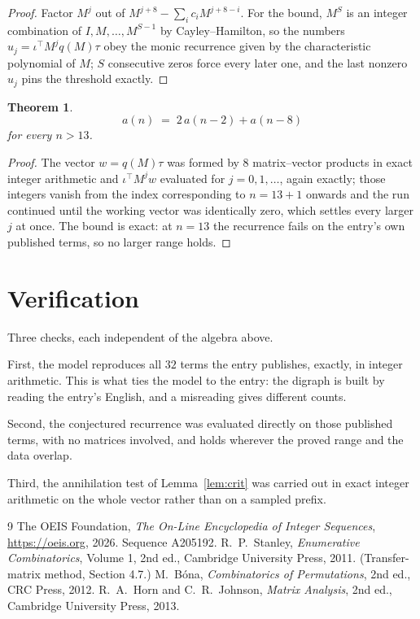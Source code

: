 \documentclass[11pt,a4paper]{article}
\theoremstyle{plain}
\newtheorem{theorem}{Theorem}
\theoremstyle{definition}
\begin{document}
\begin{proof}
Factor $M^{j}$ out of $M^{j+8}-\sum_ic_iM^{j+8-i}$. For the bound, $M^{S}$
is an integer combination of $I,M,\dots,M^{S-1}$ by Cayley--Hamilton, so the numbers
$u_j=\iota^{\!\top}M^{j}q(M)\tau$ obey the monic recurrence given by the characteristic
polynomial of $M$; $S$ consecutive zeros force every later one, and the last nonzero $u_j$
pins the threshold exactly.
\end{proof}

\begin{theorem}
\[
a(n)\;=\;2\,a(n-2) + a(n-8)
\]
for every $n>13$.
\end{theorem}

\begin{proof}
The vector $w=q(M)\tau$ was formed by $8$ matrix--vector products in exact integer
arithmetic and $\iota^{\!\top}M^{j}w$ evaluated for $j=0,1,\dots$, again exactly; those
integers vanish from the index corresponding to $n=13+1$ onwards and the run continued
until the working vector was identically zero, which settles every larger $j$ at once. The bound is exact: at $n=13$ the recurrence fails on the entry's own published terms, so no larger range holds.
\end{proof}

\section{Verification}

Three checks, each independent of the algebra above.

First, the model reproduces all $32$ terms the entry publishes, exactly, in integer
arithmetic. This is what ties the model to the entry: the digraph is built by reading the
entry's English, and a misreading gives different counts.

Second, the conjectured recurrence was evaluated directly on those published terms, with no
matrices involved, and holds wherever the proved range and the data overlap.

Third, the annihilation test of Lemma~\ref{lem:crit} was carried out in exact integer
arithmetic on the whole vector rather than on a sampled prefix.

\begin{thebibliography}{9}
 The OEIS Foundation, \emph{The On-Line Encyclopedia of Integer
Sequences}, \url{https://oeis.org}, 2026. Sequence A205192.
 R.~P.~Stanley, \emph{Enumerative Combinatorics}, Volume 1, 2nd ed.,
Cambridge University Press, 2011. (Transfer-matrix method, Section 4.7.)
 M.~B\'ona, \emph{Combinatorics of Permutations}, 2nd ed., CRC
Press, 2012.
 R.~A.~Horn and C.~R.~Johnson, \emph{Matrix Analysis}, 2nd ed., Cambridge
University Press, 2013.
\end{thebibliography}
\end{document}
